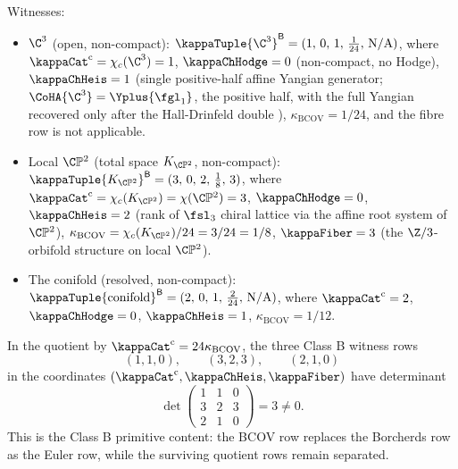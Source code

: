 \begin{theorem}
Witnesses:
\begin{itemize}
\item $\C^3$ \textup(open, non-compact\textup):
$\kappaTuple{\C^3}^{\mathsf B}
= (1,\, 0,\, 1,\, \frac{1}{24},\, \mathrm{N/A})$,
where \(\kappaCat^{\mathrm c}=\chi_c(\C^3)=1\),
$\kappaChHodge = 0$ \textup(non-compact, no Hodge\textup),
$\kappaChHeis = 1$ \textup(single positive-half affine Yangian
generator; $\CoHA{\C^3} = \Yplus{\fgl_1}$, the positive half, with
the full Yangian recovered only after the Hall-Drinfeld double
\cite{SchiffmannVasserot2013}\textup),
$\kappa_{\mathrm{BCOV}} = 1/24$, and
the fibre row is not applicable.
\item Local $\C\mathbb{P}^2$ \textup(total space $K_{\C\mathbb{P}^2}$, non-compact\textup):
$\kappaTuple{K_{\C\mathbb{P}^2}}^{\mathsf B}
= (3,\, 0,\, 2,\, \frac{1}{8},\, 3)$,
where \(\kappaCat^{\mathrm c}=\chi_c(K_{\C\mathbb{P}^2})=
\chi(\C\mathbb{P}^2)=3\),
$\kappaChHodge = 0$,
$\kappaChHeis = 2$ \textup(rank of $\fsl_3$ chiral lattice via
the affine root system of $\C\mathbb{P}^2$\textup),
$\kappa_{\mathrm{BCOV}} = \chi_c(K_{\C\mathbb{P}^2})/24 = 3/24 = 1/8$,
$\kappaFiber = 3$ \textup(the $\Z/3$-orbifold structure on local
$\C\mathbb{P}^2$\textup).
\item The conifold \textup(resolved, non-compact\textup):
$\kappaTuple{\mathrm{conifold}}^{\mathsf B}
= (2,\, 0,\, 1,\, \frac{2}{24},\, \mathrm{N/A})$,
where \(\kappaCat^{\mathrm c}=2\), $\kappaChHodge = 0$,
\(\kappaChHeis=1\),
$\kappa_{\mathrm{BCOV}} = 1/12$.
\end{itemize}
In the quotient by \(\kappaCat^{\mathrm c}=24\kappa_{\mathrm{BCOV}}\),
the three Class B witness rows
\[
 (1,1,0),\qquad (3,2,3),\qquad (2,1,0)
\]
in the coordinates
\((\kappaCat^{\mathrm c},\kappaChHeis,\kappaFiber)\) have determinant
\[
\det\begin{pmatrix}1&1&0\\3&2&3\\2&1&0\end{pmatrix}=3\neq0.
\]
This is the Class B primitive content: the BCOV row replaces the
Borcherds row as the Euler row, while the surviving quotient rows
remain separated.
\end{theorem}

